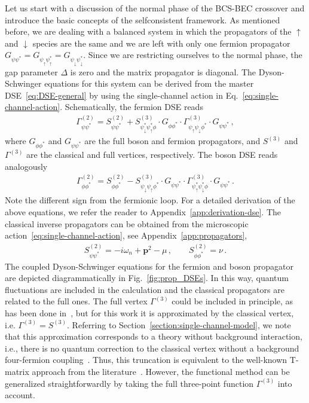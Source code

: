 Let us start with a discussion of the normal phase of the BCS-BEC crossover and introduce the basic concepts of the selfconsistent framework. As mentioned before, we are dealing with a balanced system in which the propagators of the $\uparrow$ and $\downarrow$ species are the same and we are left with only one fermion propagator $G_{\psi\psi^*} = G_{\psi_{\uparrow}\psi_{\uparrow}^*} = G_{\psi_{\downarrow}\psi_{\downarrow}^*}$. Since we are restricting ourselves to the normal phase, the gap parameter $\Delta$ is zero and the matrix propagator is diagonal. The Dyson-Schwinger equations for this system can be derived from the master DSE~\eqref{eq:DSE-general} by using the single-channel action in Eq.~\eqref{eq:single-channel-action}. Schematically, the fermion DSE reads
%
\begin{align}
	\label{eq:fermion-DSE}
	\Gamma^{(2)}_{\psi\psi^*} = S^{(2)}_{\psi\psi^*}
	+ S^{(3)}_{\psi^*_{\downarrow}\psi^*_{\uparrow}\phi} \cdot G_{\phi\phi^*}
	\cdot \Gamma^{(3)}_{\psi_{\uparrow}\psi_{\downarrow}\phi^*}
	\cdot G_{\psi\psi^*}  \,,
\end{align}
%
where $G_{\phi\phi^*}$ and $G_{\psi\psi^*}$ are the full boson and fermion propagators, and $S^{(3)}$ and $\Gamma^{(3)}$ are the classical and full vertices, respectively. The boson DSE reads analogously
%
\begin{align}
	\label{eq:boson-DSE}
	\Gamma^{(2)}_{\phi\phi^*} = S^{(2)}_{\phi\phi^*}
	- S^{(3)}_{\psi_{\downarrow}\psi_{\uparrow}\phi^*} \cdot G_{\psi\psi^*}
	\cdot \Gamma^{(3)}_{\psi^*_{\uparrow}\psi^*_{\downarrow}\phi}
	\cdot G_{\psi\psi^*}  \,.
\end{align}
%
Note the different sign from the fermionic loop. For a detailed derivation of the above equations, we refer the reader to Appendix~\ref{app:derivation-dse}.
The classical inverse propagators can be obtained from the microscopic action~\eqref{eq:single-channel-action}, see Appendix~\ref{app:propagators},
%
\begin{align}
	\label{eq:classical-propagators}
	S^{(2)}_{\psi\psi^*} = -i\omega_n+\bm{p}^2-\mu \,, \qquad
	S^{(2)}_{\phi\phi^*} = \nu \,.
\end{align}
%
The coupled Dyson-Schwinger equations for the fermion and boson propagator are depicted diagrammatically in Fig.~\ref{fig:prop_DSEs}. In this way, quantum fluctuations are included in the calculation and the classical propagators are related to the full ones. The full vertex $\Gamma^{(3)}$ could be included in principle, as has been done in~\cite{Horak2020}, but for this work it is approximated by the classical vertex, i.e. $\Gamma^{(3)}=S^{(3)}$. Referring to Section~\ref{section:single-channel-model}, we note that this approximation corresponds to a theory without background interaction, i.e., there is no quantum correction to the classical vertex without a background four-fermion coupling~\cite{Diehl2006-1}. Thus, this truncation is equivalent to the well-known T-matrix approach from the literature~\cite{Haussmann2007,Hanai2013}. However, the functional method can be generalized straightforwardly by taking the full three-point function $\Gamma^{(3)}$ into account.

